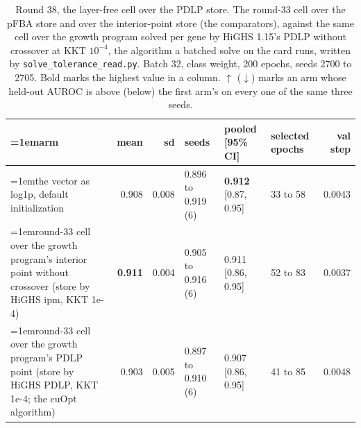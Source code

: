 \begin{table}[H]
  \centering
  \scriptsize
  \setlength{\tabcolsep}{2.5pt}
  \caption[Round 38, the layer-free cell over the PDLP store]{Round 38, the layer-free cell over the PDLP store. The round-33 cell over the pFBA store and over the interior-point store (the comparators), against the same cell over the growth program solved per gene by HiGHS 1.15's PDLP without crossover at KKT $10^{-4}$, the algorithm a batched solve on the card runs, written by \texttt{solve\_tolerance\_read.py}. Batch 32, class weight, 200 epochs, seeds 2700 to 2705. Bold marks the highest value in a column. $\uparrow$ ($\downarrow$) marks an arm whose held-out AUROC is above (below) the first arm's on every one of the same three seeds.}
  \label{tab:w54}
  \begin{tabular}{@{}>{\raggedright\hangindent=1em\hangafter=1\arraybackslash}p{84.4mm}rrlllr@{}}
    \hline
    arm & mean & sd & seeds & pooled [95\% CI] & selected epochs & val step \\
    \hline
    the vector as log1p, default initialization & 0.908 & 0.008 & 0.896 to 0.919 (6) & \textbf{0.912} [0.87, 0.95] & 33 to 58 & 0.0043 \\
    round-33 cell over the growth program's interior point without crossover (store by HiGHS ipm, KKT 1e-4) & \textbf{0.911} & 0.004 & 0.905 to 0.916 (6) & 0.911 [0.86, 0.95] & 52 to 83 & 0.0037 \\
    round-33 cell over the growth program's PDLP point (store by HiGHS PDLP, KKT 1e-4; the cuOpt algorithm) & 0.903 & 0.005 & 0.897 to 0.910 (6) & 0.907 [0.86, 0.95] & 41 to 85 & 0.0048 \\
    \hline
  \end{tabular}
\end{table}
